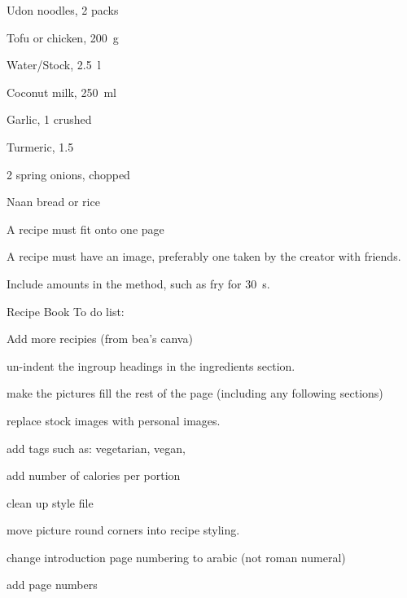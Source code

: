 \label{recipe:recipe_template}


\begin{ingredients}

  \item Udon noodles, 2 packs
  \item Tofu or chicken, \SI{200}{\gram}
  \item Water/Stock, \SI{2.5}{\litre}
  \item Coconut milk, \SI{250}{\milli \litre}
  \item Garlic, \SI{1}{\tablespoon} crushed
  \item Turmeric, \SI{1.5}{\teaspoon}

  \item 2 spring onions, chopped
  \item Naan bread or rice
\end{ingredients}


\begin{method}
  	A recipe must fit onto one page
  
  	A recipe must have an image, preferably one taken by the creator with friends.

  	Include amounts in the method, such as fry for \SI{30}{\second}.

  	Recipe Book To do list:
  
  	Add more recipies (from bea's canva)
  
  	un-indent the ingroup headings in the ingredients section.
  
  	make the pictures fill the rest of the page (including any following sections)

	replace stock images with personal images.
	
	add tags such as: vegetarian, vegan, 
	
	add number of calories per portion
	
	clean up style file
	
	move picture round corners into recipe styling.
	
	change introduction page numbering to arabic (not roman numeral)
	
	add page numbers
  
\end{method}


